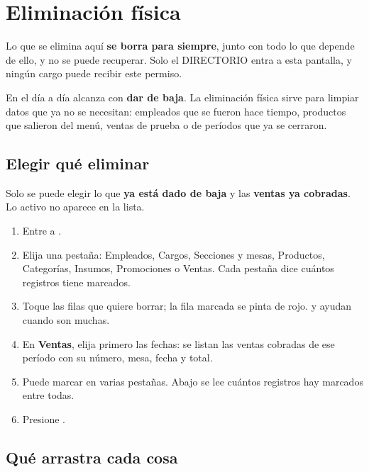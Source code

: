 \chapter{Eliminación física}
\label{cap:eliminacion}

\begin{importante}
Lo que se elimina aquí \textbf{se borra para siempre}, junto con todo lo que depende de ello, y no se puede recuperar. Solo el DIRECTORIO entra a esta pantalla, y ningún cargo puede recibir este permiso.
\end{importante}

En el día a día alcanza con \textbf{dar de baja}. La eliminación física sirve para limpiar datos que ya no se necesitan: empleados que se fueron hace tiempo, productos que salieron del menú, ventas de prueba o de períodos que ya se cerraron.


\section{Elegir qué eliminar}

Solo se puede elegir lo que \textbf{ya está dado de baja} y las \textbf{ventas ya cobradas}. Lo activo no aparece en la lista.

\begin{enumerate}
  \item Entre a .
  \item Elija una pestaña: Empleados, Cargos, Secciones y mesas, Productos, Categorías, Insumos, Promociones o Ventas. Cada pestaña dice cuántos registros tiene marcados.
  \item Toque las filas que quiere borrar; la fila marcada se pinta de rojo.  y  ayudan cuando son muchas.
  \item En \textbf{Ventas}, elija primero las fechas: se listan las ventas cobradas de ese período con su número, mesa, fecha y total.
  \item Puede marcar en varias pestañas. Abajo se lee cuántos registros hay marcados entre todas.
  \item Presione .
\end{enumerate}

\section{Qué arrastra cada cosa}

